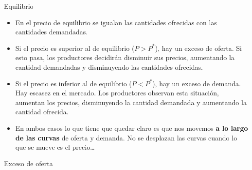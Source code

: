 \documentclass{beamer}
\begin{document}
\begin{frame}{Equilibrio}
    \begin{itemize}
        \item En el precio de equilibrio se igualan las cantidades ofrecidas con las cantidades demandadas.
        \item Si el precio es superior al de equilibrio ($P > P^*$), hay un exceso de oferta. Si esto pasa, los productores decidirán disminuir sus precios, aumentando la cantidad demandadas y disminuyendo las cantidades ofrecidas.
        \item Si el precio es inferior al de equilibrio ($P < P^*$), hay un exceso de demanda. Hay escasez en el mercado. Los productores observan esta situación, aumentan los precios, disminuyendo la cantidad demandada y aumentando la cantidad ofrecida.
        \item En ambos casos lo que tiene que quedar claro es que nos movemos \textbf{a lo largo de las curvas} de oferta y demanda. No se desplazan las curvas cuando lo que se mueve es el precio\dots
    \end{itemize}
\end{frame}

\begin{frame}{Exceso de oferta}
    \begin{center}
    \end{center}
\end{frame}
\end{document}

